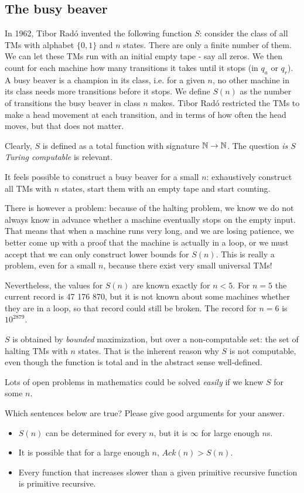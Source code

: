\subsection{The busy beaver}

In 1962, Tibor Rad\'{o} invented the following function $S$:
consider the class of all TMs with alphabet $\{0,1\}$ and $n$
states. There are only a finite number of them. We can let these
TMs run with an initial empty tape - say all zeros. We then count for
each machine how many transitions it takes until it stops (in $q_a$ or
$q_r$).  A busy beaver is a champion in its class, i.e. for a given
$n$, no other machine in its class needs more transitions before it
stops. We define $S(n)$ as the number of transitions the busy beaver
in class $n$ makes. Tibor Rad\'{o} restricted the TMs to make a head
movement at each transition, and in terms of how often the head moves,
but that does not matter.

Clearly, $S$ is defined as a total function with signature $\mathbb{N}
\rightarrow \mathbb{N}$. The question {\em is $S$ Turing computable} is
relevant.


It feels possible to construct a busy beaver for a small $n$: exhaustively construct
all TMs with $n$ states, start them with an empty tape
and start counting.

There is however a problem: because of the halting problem, we know we
do not always know in advance whether a machine eventually stops on
the empty input. That means that when a machine runs very long, and we
are losing patience, we better come up with a proof that the machine
is actually in a loop, or we must accept that we can only
construct lower bounds for $S(n)$. This is really a problem, even for
a small $n$, because there exist very small universal TMs!

Nevertheless, the values for $S(n)$ are known exactly for $n <
5$. For $n = 5$ the current record is 47 176 870, but it is not known
about some machines whether they are in a loop, so that record could
still be broken. The record for $n = 6$ is $10^{2879}$.

$S$ is obtained by {\em bounded} maximization, but over a
non-computable set: the set of halting TMs with $n$ states. That is
the inherent reason why $S$ is not computable, even though the
function is total and in the abstract sense well-defined.

Lots of open problems in mathematics could be solved {\em easily} if
we knew $S$ for some $n$.

\begin{exercise}
Which sentences below are true? Please give good arguments for your answer.
\begin{itemize}
\item $S(n)$ can be determined for every $n$, but it is $\infty$ for
  large enough $n$s.

\item It is possible that for a large enough $n$, $Ack(n) > S(n)$.

\item Every function that increases slower than a given primitive recursive
function is primitive recursive.
\end{itemize}
\end{exercise}

